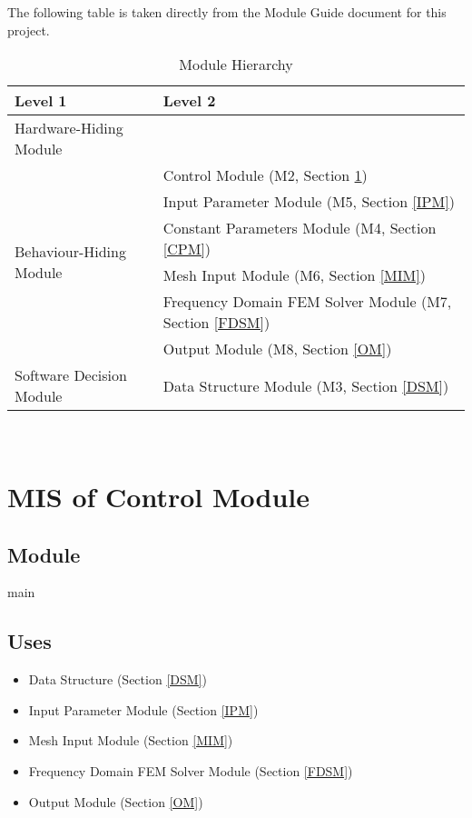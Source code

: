 \documentclass[12pt, titlepage]{article}
\begin{document}
	The following table is taken directly from the Module Guide document for this
	project.
	
	
	\begin{table}[h!] \centering \begin{tabular}{p{} p{}}
			\toprule \textbf{Level 1} & \textbf{Level 2}\\ \midrule
			
			{Hardware-Hiding Module} & ~ \\ \midrule
			
			\multirow{6}{0.3\textwidth}{Behaviour-Hiding Module} & \progname{} Control
			Module (M2, Section \ref{Module})\\ & Input Parameter Module (M5, Section \ref{IPM})\\ & Constant Parameters Module (M4, Section \ref{CPM})\\ & Mesh
			Input Module (M6, Section \ref{MIM})\\ & Frequency Domain FEM Solver Module (M7, Section \ref{FDSM})\\ & Output Module (M8, Section \ref{OM})\\ \midrule
			
			\multirow{1}{0.3\textwidth}{Software Decision Module} & Data Structure Module (M3, Section \ref{DSM})\\ \bottomrule
			
		\end{tabular} \caption{Module Hierarchy} \label{TblMH} \end{table}
	
	
	~\newpage
	
	\section{MIS of \progname{} Control Module} \label{Module}
	
	\subsection{Module} main
	
	\subsection{Uses} \begin{itemize} \item Data Structure (Section \ref{DSM}) \item
		Input Parameter Module (Section \ref{IPM}) \item Mesh Input Module (Section
		\ref{MIM}) \item Frequency Domain FEM Solver Module (Section \ref{FDSM}) \item Output
		Module (Section \ref{OM})\\ \end{itemize}
	
\end{document}
